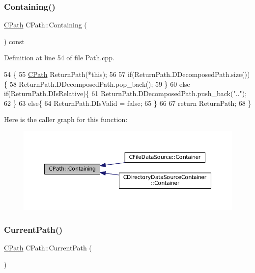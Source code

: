\subsubsection{\texorpdfstring{Containing()}{Containing()}}
{\footnotesize\ttfamily \hyperlink{classCPath}{C\+Path} C\+Path\+::\+Containing (\begin{DoxyParamCaption}{ }\end{DoxyParamCaption}) const}



Definition at line 54 of file Path.\+cpp.


\begin{DoxyCode}
54                              \{
55     \hyperlink{classCPath}{CPath} ReturnPath(*\textcolor{keyword}{this});
56     
57     \textcolor{keywordflow}{if}(ReturnPath.DDecomposedPath.size())\{
58         ReturnPath.DDecomposedPath.pop\_back();
59     \}
60     \textcolor{keywordflow}{else} \textcolor{keywordflow}{if}(ReturnPath.DIsRelative)\{
61         ReturnPath.DDecomposedPath.push\_back(\textcolor{stringliteral}{".."});
62     \}
63     \textcolor{keywordflow}{else}\{
64         ReturnPath.DIsValid = \textcolor{keyword}{false};   
65     \}
66     
67     \textcolor{keywordflow}{return} ReturnPath;
68 \}
\end{DoxyCode}
Here is the caller graph for this function\+:
\nopagebreak
\begin{figure}[H]
\begin{center}
\leavevmode
\includegraphics[width=350pt]{classCPath_a24d8c455b1663ce251d3a749437fa4fe_icgraph}
\end{center}
\end{figure}
\hypertarget{classCPath_a5161b834e754b217ddead2437eaaa223}{}\label{classCPath_a5161b834e754b217ddead2437eaaa223} 
\subsubsection{\texorpdfstring{Current\+Path()}{CurrentPath()}\hspace{0.1cm}{\footnotesize\ttfamily [1/2]}}
{\footnotesize\ttfamily \hyperlink{classCPath}{C\+Path} C\+Path\+::\+Current\+Path (\begin{DoxyParamCaption}{ }\end{DoxyParamCaption})\hspace{0.3cm}{\ttfamily [static]}}



